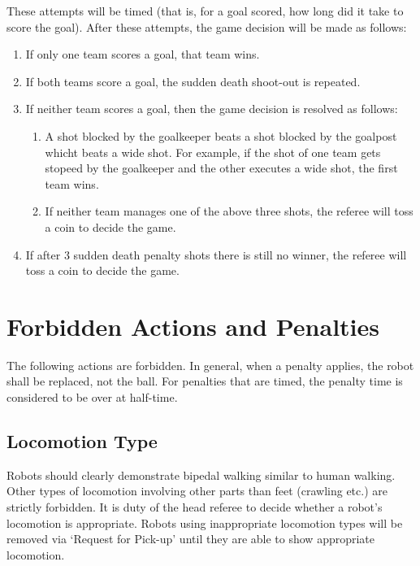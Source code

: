 \documentclass[12pt]{article}
\begin{document}
These attempts will be timed (that is, for a goal scored, how long did it take to score the goal). After these attempts, the game decision will be made as follows:

\begin{enumerate}

\item If only one team scores a goal, that team wins.

\item If both teams score a goal, the sudden death shoot-out is repeated.

\item If neither team scores a goal, then the game decision is resolved as follows:

\begin{enumerate}

\item A shot blocked by the goalkeeper beats a shot blocked by the goalpost whicht beats a wide shot. For example, if the shot of one team gets stopeed by the goalkeeper and the other executes a wide shot, the first team wins.

\item If neither team manages one of the above three shots, the referee will toss a coin to decide the game.

\end{enumerate}

\item If after 3 sudden death penalty shots there is still no winner, the referee will toss a coin to decide the game.

\end{enumerate}


\newpage


\section{Forbidden Actions and Penalties}
\label{sec:forbidden_act}

The following actions are forbidden. In general, when a penalty applies, the robot shall be replaced, not the ball. For penalties that are timed, the penalty time is considered to be over at half-time.

\subsection{Locomotion Type}
\label{sec:locomotion_type}

Robots should clearly demonstrate bipedal walking similar to human walking. Other types of locomotion involving other parts than feet (crawling etc.) are strictly forbidden. It is duty of the head referee to decide whether a robot's locomotion is appropriate. Robots using inappropriate locomotion types will be removed via `Request for Pick-up' until they are able to show appropriate locomotion.
\end{document}
